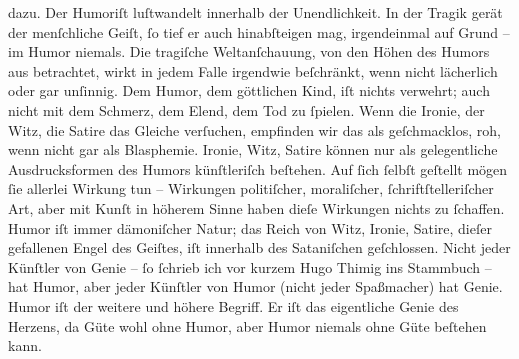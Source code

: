 \begin{ledgroupsized}[t]{13cm}
                  dazu.\pend
           \pstart
           Der Humoriſt luſtwandelt innerhalb der Unendlichkeit.\pend
           \pstart
           In der Tragik gerät der menſchliche Geiſt, ſo tief er auch hinabſteigen mag,
                  irgendeinmal auf Grund – im Humor niemals.\pend
           \pstart
           Die tragiſche Weltanſchauung, von den Höhen des Humors aus betrachtet, wirkt in
                  jedem Falle irgendwie beſchränkt, wenn nicht lächerlich oder gar unſinnig.\pend
           \pstart
           Dem Humor, dem göttlichen Kind, iſt nichts verwehrt; auch nicht mit dem Schmerz,
                  dem Elend, dem Tod zu ſpielen. Wenn die Ironie, der Witz, die Satire das Gleiche
                  verſuchen, empfinden wir das als geſchmacklos, roh, wenn nicht gar als
                  Blasphemie.\pend
           \pstart
           Ironie, Witz, Satire können nur als gelegentliche Ausdrucksformen des Humors
                  künſtleriſch beſtehen. Auf ſich ſelbſt geſtellt mögen ſie allerlei Wirkung tun –
                  Wirkungen politiſcher, moraliſcher, ſchriftſtelleriſcher Art, aber mit Kunſt in
                  höherem Sinne haben dieſe Wirkungen nichts zu ſchaffen.\pend
           \pstart
           Humor iſt immer dämoniſcher Natur; das Reich von Witz, Ironie, Satire, dieſer
                  gefallenen Engel des Geiſtes, iſt innerhalb des Sataniſchen geſchlossen.\pend
           \pstart
           Nicht jeder Künſtler von Genie – ſo ſchrieb ich vor kurzem Hugo Thimig ins Stammbuch – hat Humor, aber jeder Künſtler
                  von Humor (nicht jeder Spaßmacher) hat Genie. Humor iſt der weitere und höhere
                  Begriff. Er iſt das eigentliche Genie des Herzens, da Güte wohl ohne Humor, aber
                  Humor niemals ohne Güte beſtehen kann.\pend
                     \endnumbering{}\end{ledgroupsized}  \newcommand{\dateiname}{L02442}\newcommand{\titel}{Arthur Schnitzler an Thomas Mann, 7. 6. 1925}\newcommand{\editorInnen}{Martin Anton Müller und Gerd-Hermann Susen}
      